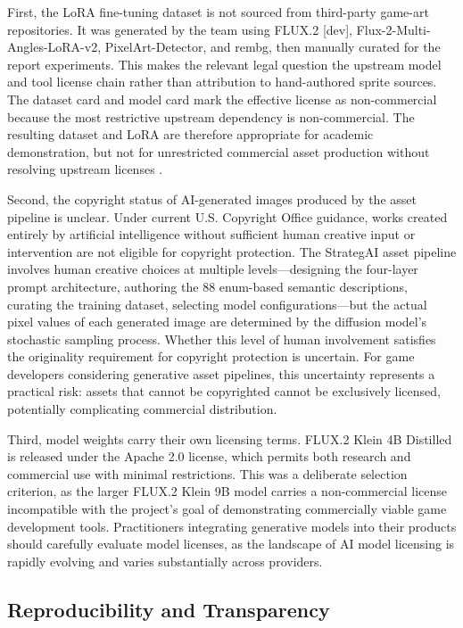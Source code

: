 \documentclass[conference]{IEEEtran}
\begin{document}
First, the LoRA fine-tuning dataset is not sourced from third-party game-art repositories. It was generated by the team using FLUX.2 [dev], Flux-2-Multi-Angles-LoRA-v2, PixelArt-Detector, and rembg, then manually curated for the report experiments. This makes the relevant legal question the upstream model and tool license chain rather than attribution to hand-authored sprite sources. The dataset card and model card mark the effective license as non-commercial because the most restrictive upstream dependency is non-commercial. The resulting dataset and LoRA are therefore appropriate for academic demonstration, but not for unrestricted commercial asset production without resolving upstream licenses \cite{samuelson2023generative}.

Second, the copyright status of AI-generated images produced by the asset pipeline is unclear. Under current U.S. Copyright Office guidance, works created entirely by artificial intelligence without sufficient human creative input or intervention are not eligible for copyright protection. The StrategAI asset pipeline involves human creative choices at multiple levels---designing the four-layer prompt architecture, authoring the 88 enum-based semantic descriptions, curating the training dataset, selecting model configurations---but the actual pixel values of each generated image are determined by the diffusion model's stochastic sampling process. Whether this level of human involvement satisfies the originality requirement for copyright protection is uncertain. For game developers considering generative asset pipelines, this uncertainty represents a practical risk: assets that cannot be copyrighted cannot be exclusively licensed, potentially complicating commercial distribution.

Third, model weights carry their own licensing terms. FLUX.2 Klein 4B Distilled is released under the Apache 2.0 license, which permits both research and commercial use with minimal restrictions. This was a deliberate selection criterion, as the larger FLUX.2 Klein 9B model carries a non-commercial license incompatible with the project's goal of demonstrating commercially viable game development tools. Practitioners integrating generative models into their products should carefully evaluate model licenses, as the landscape of AI model licensing is rapidly evolving and varies substantially across providers.

\subsection{Reproducibility and Transparency}
\end{document}
